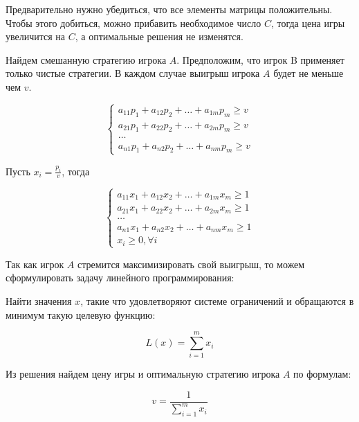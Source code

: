 \documentclass[9pt, a4paper]{article}
\begin{document}
    Предварительно нужно убедиться, что все элементы матрицы положительны.
    Чтобы этого добиться, можно прибавить необходимое число $C$, тогда цена игры увеличится на $C$,
    а оптимальные решения не изменятся.

    Найдем смешанную стратегию игрока $A$.
    Предположим, что игрок B применяет только чистые стратегии.
    В каждом случае выигрыш игрока $A$ будет не меньше чем $v$.

    \begin{equation}
        \begin{cases}
            a_{11}p_1 + a_{12}p_2 + \dots + a_{1m}p_m \ge v\\
            a_{21}p_1 + a_{22}p_2 + \dots + a_{2m}p_m \ge v\\
            \dots\\
            a_{n1}p_1 + a_{n2}p_2 + \dots + a_{nm}p_m \ge v
        \end{cases}\label{eq:equation4}
    \end{equation}

    Пусть $x_i = \frac{p_i}{v}$, тогда

    \begin{equation}
        \begin{cases}
            a_{11}x_1 + a_{12}x_2 + \dots + a_{1m}x_m \ge 1\\
            a_{21}x_1 + a_{22}x_2 + \dots + a_{2m}x_m \ge 1\\
            \dots\\
            a_{n1}x_1 + a_{n2}x_2 + \dots + a_{nm}x_m \ge 1\\
            x_i \ge 0, \forall i
        \end{cases}\label{eq:equation5}
    \end{equation}

    Так как игрок $A$ стремится максимизировать свой выигрыш, то можем
    сформулировать задачу линейного программирования:

    Найти значения $x$, такие что удовлетворяют системе ограничений
    и обращаются в минимум такую целевую функцию:

    \begin{equation}
        L(x) = \sum_{i=1}^m x_i\label{eq:equation6}
    \end{equation}

    Из решения найдем цену игры и оптимальную стратегию игрока $A$
    по формулам:

    \begin{equation}
        v = \frac{1}{\sum_{i=1}^m x_i}\label{eq:equation7}
    \end{equation}
\end{document}
